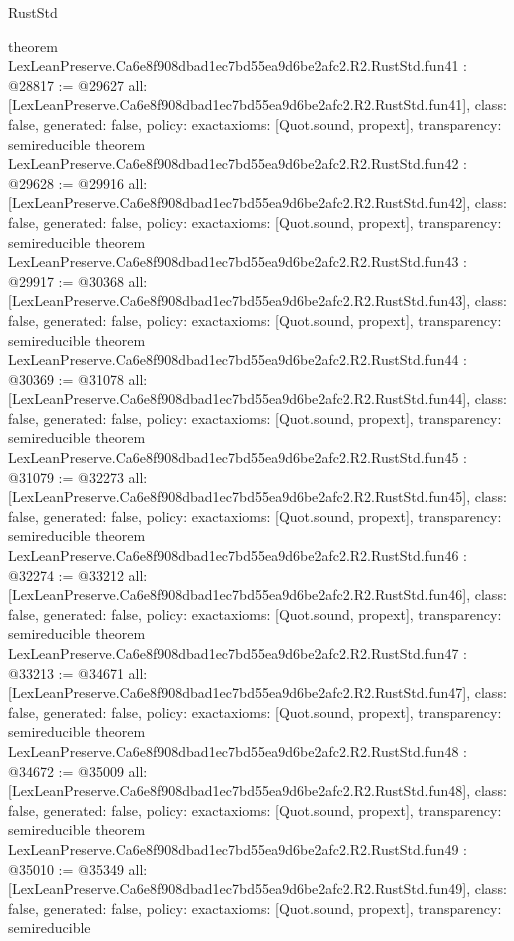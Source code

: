 \begin{lexlean}{RustStd}
\begin{coremodule}
{}
theorem LexLeanPreserve.Ca6e8f908dbad1ec7bd55ea9d6be2afc2.R2.RustStd.fun41 : @28817 := @29627 {
  all: [LexLeanPreserve.Ca6e8f908dbad1ec7bd55ea9d6be2afc2.R2.RustStd.fun41],
  class: false,
  generated: false,
  policy: exact{axioms: [Quot.sound, propext]},
  transparency: semireducible
}
theorem LexLeanPreserve.Ca6e8f908dbad1ec7bd55ea9d6be2afc2.R2.RustStd.fun42 : @29628 := @29916 {
  all: [LexLeanPreserve.Ca6e8f908dbad1ec7bd55ea9d6be2afc2.R2.RustStd.fun42],
  class: false,
  generated: false,
  policy: exact{axioms: [Quot.sound, propext]},
  transparency: semireducible
}
theorem LexLeanPreserve.Ca6e8f908dbad1ec7bd55ea9d6be2afc2.R2.RustStd.fun43 : @29917 := @30368 {
  all: [LexLeanPreserve.Ca6e8f908dbad1ec7bd55ea9d6be2afc2.R2.RustStd.fun43],
  class: false,
  generated: false,
  policy: exact{axioms: [Quot.sound, propext]},
  transparency: semireducible
}
theorem LexLeanPreserve.Ca6e8f908dbad1ec7bd55ea9d6be2afc2.R2.RustStd.fun44 : @30369 := @31078 {
  all: [LexLeanPreserve.Ca6e8f908dbad1ec7bd55ea9d6be2afc2.R2.RustStd.fun44],
  class: false,
  generated: false,
  policy: exact{axioms: [Quot.sound, propext]},
  transparency: semireducible
}
theorem LexLeanPreserve.Ca6e8f908dbad1ec7bd55ea9d6be2afc2.R2.RustStd.fun45 : @31079 := @32273 {
  all: [LexLeanPreserve.Ca6e8f908dbad1ec7bd55ea9d6be2afc2.R2.RustStd.fun45],
  class: false,
  generated: false,
  policy: exact{axioms: [Quot.sound, propext]},
  transparency: semireducible
}
theorem LexLeanPreserve.Ca6e8f908dbad1ec7bd55ea9d6be2afc2.R2.RustStd.fun46 : @32274 := @33212 {
  all: [LexLeanPreserve.Ca6e8f908dbad1ec7bd55ea9d6be2afc2.R2.RustStd.fun46],
  class: false,
  generated: false,
  policy: exact{axioms: [Quot.sound, propext]},
  transparency: semireducible
}
theorem LexLeanPreserve.Ca6e8f908dbad1ec7bd55ea9d6be2afc2.R2.RustStd.fun47 : @33213 := @34671 {
  all: [LexLeanPreserve.Ca6e8f908dbad1ec7bd55ea9d6be2afc2.R2.RustStd.fun47],
  class: false,
  generated: false,
  policy: exact{axioms: [Quot.sound, propext]},
  transparency: semireducible
}
theorem LexLeanPreserve.Ca6e8f908dbad1ec7bd55ea9d6be2afc2.R2.RustStd.fun48 : @34672 := @35009 {
  all: [LexLeanPreserve.Ca6e8f908dbad1ec7bd55ea9d6be2afc2.R2.RustStd.fun48],
  class: false,
  generated: false,
  policy: exact{axioms: [Quot.sound, propext]},
  transparency: semireducible
}
theorem LexLeanPreserve.Ca6e8f908dbad1ec7bd55ea9d6be2afc2.R2.RustStd.fun49 : @35010 := @35349 {
  all: [LexLeanPreserve.Ca6e8f908dbad1ec7bd55ea9d6be2afc2.R2.RustStd.fun49],
  class: false,
  generated: false,
  policy: exact{axioms: [Quot.sound, propext]},
  transparency: semireducible
}
\end{coremodule}
\end{lexlean}
